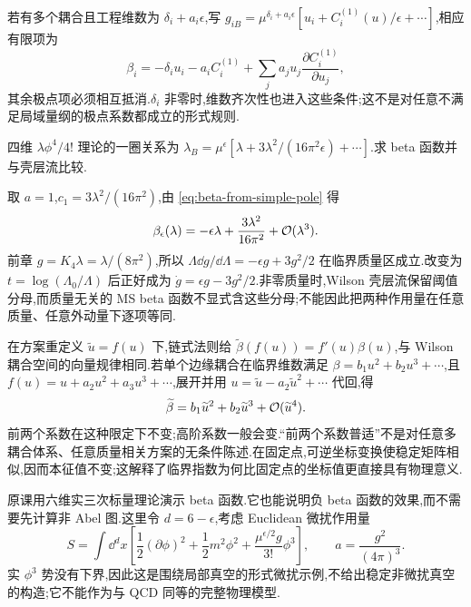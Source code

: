 若有多个耦合且工程维数为 $\delta_i+a_i\epsilon$,写
$g_{iB}=\mu^{\delta_i+a_i\epsilon}[u_i+C_i^{(1)}(u)/\epsilon+\cdots]$,相应有限项为
\begin{equation}
 \beta_i=-\delta_i u_i-a_iC_i^{(1)}
              +\sum_j a_j u_j\frac{\partial C_i^{(1)}}{\partial u_j},
 \label{eq:multi-beta-simple-pole}
\end{equation}
其余极点项必须相互抵消.$\delta_i$ 非零时,维数齐次性也进入这些条件;这不是对任意不满足局域量纲的极点系数都成立的形式规则.

\begin{example}
四维 $\lambda\phi^4/4!$ 理论的一圈关系为
$\lambda_B=\mu^\epsilon[\lambda+3\lambda^2/(16\pi^2\epsilon)+\cdots]$.求 beta 函数并与壳层流比较.
\end{example}
\begin{solution}
取 $a=1$,$c_1=3\lambda^2/(16\pi^2)$,由 \eqref{eq:beta-from-simple-pole} 得
\begin{equation}
 \beta_\epsilon(\lambda)=-\epsilon\lambda+
                      \frac{3\lambda^2}{16\pi^2}+\mathcal O(\lambda^3).
 \label{eq:phi4-traditional-beta}
\end{equation}
前章 $g=K_4\lambda=\lambda/(8\pi^2)$,所以
$\Lambda\dd g/\dd\Lambda=-\epsilon g+3g^2/2$ 在临界质量区成立.改变为 $t=\log(\Lambda_0/\Lambda)$ 后正好成为 $\dot g=\epsilon g-3g^2/2$.非零质量时,Wilson 壳层流保留阈值分母,而质量无关的 MS beta 函数不显式含这些分母;不能因此把两种作用量在任意质量、任意外动量下逐项等同.
\end{solution}

在方案重定义 $\widetilde u=f(u)$ 下,链式法则给
$\widetilde\beta(f(u))=f'(u)\beta(u)$,与 Wilson 耦合空间的向量规律相同.若单个边缘耦合在临界维数满足
$\beta=b_1u^2+b_2u^3+\cdots$,且 $f(u)=u+a_2u^2+a_3u^3+\cdots$,展开并用 $u=\widetilde u-a_2\widetilde u^2+\cdots$ 代回,得
\begin{equation}
 \widetilde\beta=b_1\widetilde u^2+b_2\widetilde u^3+\mathcal O(\widetilde u^4).
\end{equation}
前两个系数在这种限定下不变;高阶系数一般会变.“前两个系数普适”不是对任意多耦合体系、任意质量相关方案的无条件陈述.在固定点,可逆坐标变换使稳定矩阵相似,因而本征值不变;这解释了临界指数为何比固定点的坐标值更直接具有物理意义.


原课用六维实三次标量理论演示 beta 函数.它也能说明负 beta 函数的效果,而不需要先计算非 Abel 图.这里令 $d=6-\epsilon$,考虑 Euclidean 微扰作用量
\begin{equation}
 S=\int\dd^dx\left[\frac12(\partial\phi)^2+\frac12m^2\phi^2
                    +\frac{\mu^{\epsilon/2}g}{3!}\phi^3\right],
 \qquad a=\frac{g^2}{(4\pi)^3}.
\end{equation}
实 $\phi^3$ 势没有下界,因此这是围绕局部真空的形式微扰示例,不给出稳定非微扰真空的构造;它不能作为与 QCD 同等的完整物理模型.

